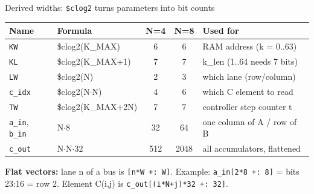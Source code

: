 \documentclass[aspectratio=169,11pt]{beamer}
\newcommand{\sig}[1]{\texttt{#1}}
\begin{document}
\begin{frame}{Derived widths: \sig{\$clog2} turns parameters into bit counts}
  \centering\small
  \begin{tabular}{@{}l l c c l@{}}
    \toprule
    \textbf{Name} & \textbf{Formula} & \textbf{N=4} & \textbf{N=8} & \textbf{Used for} \\
    \midrule
    \sig{KW}  & \$clog2(K\_MAX)        & 6  & 6  & RAM address (k = 0..63) \\
    \sig{KL}  & \$clog2(K\_MAX+1)      & 7  & 7  & k\_len (1..64 needs 7 bits) \\
    \sig{LW}  & \$clog2(N)             & 2  & 3  & which lane (row/column) \\
    \sig{c\_idx} & \$clog2(N$\cdot$N)  & 4  & 6  & which C element to read \\
    \sig{TW}  & \$clog2(K\_MAX+2N)     & 7  & 7  & controller step counter t \\
    \midrule
    \sig{a\_in}, \sig{b\_in} & N$\cdot$8        & 32  & 64   & one column of A / row of B \\
    \sig{c\_out} & N$\cdot$N$\cdot$32           & 512 & 2048 & all accumulators, flattened \\
    \bottomrule
  \end{tabular}
  \vspace{3mm}

  \raggedright\footnotesize
  \textbf{Flat vectors:} lane n of a bus is \sig{[n*W +: W]}. Example: \sig{a\_in[2*8 +: 8]} = bits
  23:16 = row 2. Element C(i,j) is \sig{c\_out[(i*N+j)*32 +: 32]}.
\end{frame}
\end{document}
